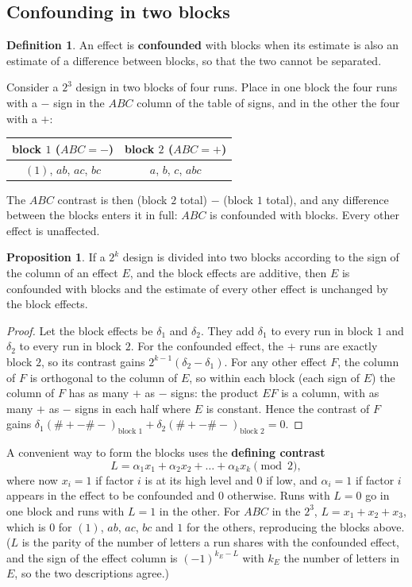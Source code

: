 \documentclass[11pt,a4paper]{article}
\numberwithin{equation}{section}
\theoremstyle{definition}
\newtheorem{defn}[thm]{Definition}
\newtheorem{prop}[thm]{Proposition}
\begin{document}
\subsection{Confounding in two blocks}
\begin{defn}
An effect is \textbf{confounded} with blocks when its estimate is also an estimate of a difference between blocks, so that the two cannot be
separated.
\end{defn}

Consider a $2^3$ design in two blocks of four runs. Place in one block the four runs with a $-$ sign in the $ABC$ column of the table of signs, and in the
other the four with a $+$:
\begin{center}
\begin{tabular}{c|c}
block $1$ ($ABC = -$) & block $2$ ($ABC = +$) \\
\hline
$(1)$, $ab$, $ac$, $bc$ & $a$, $b$, $c$, $abc$
\end{tabular}
\end{center}
The $ABC$ contrast is then (block $2$ total) $-$ (block $1$ total), and any difference between the blocks enters it in full: $ABC$ is confounded with
blocks. Every other effect is unaffected.

\begin{prop}\label{prop:confound-two}
If a $2^k$ design is divided into two blocks according to the sign of the column of an effect $E$, and the block effects are additive, then $E$ is
confounded with blocks and the estimate of every other effect is unchanged by the block effects.
\end{prop}

\begin{proof}
Let the block effects be $\delta_1$ and $\delta_2$. They add $\delta_1$ to every run in block $1$ and $\delta_2$ to every run in block $2$. For the confounded effect, the $+$
runs are exactly block $2$, so its contrast gains $2^{k-1}(\delta_2 - \delta_1)$. For any other effect $F$, the column of $F$ is orthogonal to the column of $E$, so within each
block (each sign of $E$) the column of $F$ has as many $+$ as $-$ signs: the product $EF$ is a column, with as many $+$ as $-$ signs in each half where
$E$ is constant. Hence the contrast of $F$ gains $\delta_1(\text{\#}+ - \text{\#}-)_{\text{block }1} + \delta_2(\text{\#}+ - \text{\#}-)_{\text{block }2} = 0$.
\end{proof}

A convenient way to form the blocks uses the \textbf{defining contrast}
\[
L = \alpha_1x_1 + \alpha_2x_2 + \dots + \alpha_kx_k \pmod 2 ,
\]
where now $x_i = 1$ if factor $i$ is at its high level and $0$ if low, and $\alpha_i = 1$ if factor $i$ appears in the effect to be confounded and $0$ otherwise. Runs with
$L = 0$ go in one block and runs with $L = 1$ in the other. For $ABC$ in the $2^3$, $L = x_1 + x_2 + x_3$, which is $0$ for $(1)$, $ab$, $ac$, $bc$ and $1$ for the others,
reproducing the blocks above. ($L$ is the parity of the number of letters a run shares with the confounded effect, and the sign of the effect column
is $(-1)^{k_E - L}$ with $k_E$ the number of letters in $E$, so the two descriptions agree.)
\end{document}
